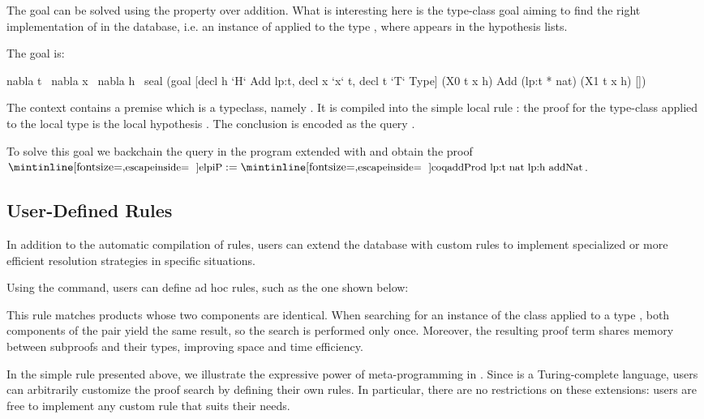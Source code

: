 The goal can be solved using the  property over addition. What is %
interesting here is the type-class goal aiming to find the right implementation
of  in the database, i.e. an instance of  applied to the type
, where  appears in the hypothesis lists.

The \elpi goal is:

\begin{coqcode}  
nabla t \ nabla x \ nabla h \ seal
  (goal 
    [decl h `H` {{Add lp:t}}, decl x `x` t, decl t `T` {{Type}}] %
    (X0 t x h)
    {{Add (lp:t * nat)}}                                     %
    (X1 t x h) [])
\end{coqcode}

The context contains a premise which is a typeclass, namely . It is compiled
into the simple local rule : the proof for the type-class
 applied to the local type  is the local hypothesis . The
conclusion is encoded as the query .

To solve this goal we backchain the query in the program extended with
 and obtain the proof $\eI{P} := \cI{addProd lp:t nat lp:h addNat}$.

\subsection{User-Defined Rules}
\label{sec:user-defined-rules}

In addition to the automatic compilation of rules, users can extend the
database with custom rules to implement specialized or more efficient
resolution strategies in specific situations.

Using the  command, users can define ad hoc rules,
such as the one shown below:



This rule matches products whose two components are identical. When
searching for an instance of the class  applied to a type ,
both components of the pair yield the same result, so the search is
performed only once. Moreover, the resulting proof term shares memory
between subproofs and their types, improving space and time efficiency.

In the simple rule presented above, we illustrate the expressive power of
meta-programming in \elpi. Since \elpi is a Turing-complete language, users
can arbitrarily customize the proof search by defining their own rules.
In particular, there are no restrictions on these extensions:
users are free to implement any custom rule that suits their needs.

